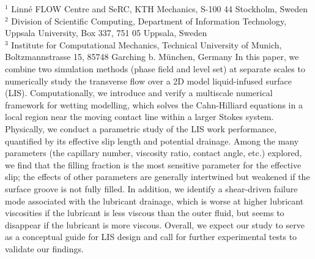 %
%
%
%
%
%
%
\paperaffiliation
{%
  $^1$ Linn\'e FLOW Centre and SeRC, KTH Mechanics, S-100 44 Stockholm, Sweden\\%
  $^2$ Division of Scientific Computing, Department of Information Technology, \\Uppsala University, Box 337, 751 05 Uppsala, Sweden\\%
  $^3$ Institute for Computational Mechanics, Technical University of Munich, Boltzmannstrasse 15, 85748 Garching b. München, Germany%
}%
%
%
%
%
%
%
%
\paperpages{}%
%
%
%
\papersummary%
{%
   In this paper, we combine two simulation methods (phase field and level set) at separate scales to numerically study
   the transverse flow over a 2D model liquid-infused surface (LIS).
   Computationally, we introduce and verify a multiscale numerical framework for wetting modelling,
   which solves the Cahn-Hilliard equations in a local region near the moving contact line within a larger Stokes system.
   Physically, we conduct a parametric study of the LIS work performance, quantified by its effective slip length and potential drainage.
   Among the many parameters (the capillary number, viscosity ratio, contact angle, etc.) explored,
   we find that the filling fraction is the most sensitive parameter for the effective slip;
   the effects of other parameters are generally intertwined but weakened if the surface groove is not fully filled.
   In addition, we identify a shear-driven failure mode associated with the lubricant drainage,
   which is worse at higher lubricant viscosities if the lubricant is less viscous than the outer fluid,
   but seems to disappear if the lubricant is more viscous.
   Overall, we expect our study to serve as a conceptual guide for LIS design and call for further experimental tests to validate our findings.
}%
